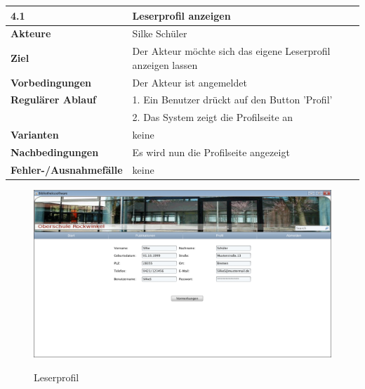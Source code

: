 \documentclass[fontsize=12pt,paper=a4,twoside]{scrartcl}
\begin{document}
\begin{table}[htbp]
\label{4.1}
\begin{tabular}{|l|p{10cm}|}
\hline 
\textbf{4.1} & \textbf{Leserprofil anzeigen} \\ \hline
\textbf{Akteure} & Silke Schüler\\ \hline
\textbf{Ziel} & Der Akteur möchte sich das eigene Leserprofil anzeigen lassen  \\ \hline
\textbf{Vorbedingungen} & Der Akteur ist angemeldet  \\ \hline
\textbf{Regulärer Ablauf} & 
1. Ein Benutzer drückt auf den Button 'Profil' \\
&2. Das System zeigt die Profilseite an\\
\hline
\textbf{Varianten} & 
keine \\ \hline
\textbf{Nachbedingungen} & Es wird nun die Profilseite angezeigt \\ \hline
\textbf{Fehler-/Ausnahmefälle} & keine\\
\hline
\end{tabular}
\end{table}

\begin{figure}[htbp]
\caption{Leserprofil}
\includegraphics[width=1\textwidth]{ScreensWebsite/Profil.png}
\label{Leserprofil}
\end{figure}
\end{document}
